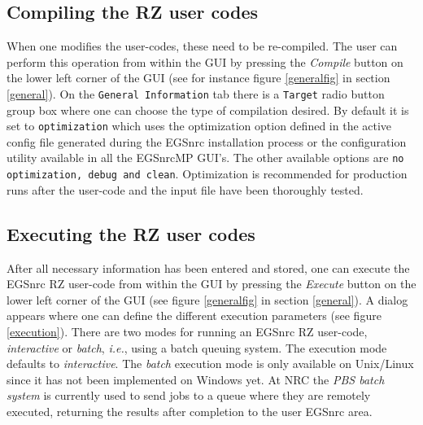 \documentclass[12pt,twoside]{article}   %
\newcommand{\ie}{{\em i.e.}}
\begin{document}
\subsection{Compiling the RZ user codes}

When one modifies the user-codes, these need to be re-compiled.
The user can perform
this operation from within the GUI by pressing the {\em Compile} button on the  lower left
corner of the GUI (see for instance figure \ref{generalfig} in section \ref{general}).
On the {\tt General Information} tab there is a {\tt Target} radio button group box where
one can choose the type of compilation desired. By default it is set to {\tt optimization}
which uses the optimization option defined in the active config file generated during the
EGSnrc installation process or the configuration utility available in all the EGSnrcMP GUI's.
The other available options are {\tt no optimization, debug and clean}.
Optimization is recommended for production runs after the user-code
and the input file have been thoroughly tested.

\subsection{Executing the RZ user codes}

After all necessary information has been entered and stored, one can execute the EGSnrc
RZ user-code from within the GUI by pressing the {\em Execute} button on the  lower left
corner of the GUI (see figure \ref{generalfig} in section \ref{general}). A dialog appears
where one can define the different execution parameters (see figure \ref{execution}).
There are two modes for running an EGSnrc RZ user-code, {\it interactive} or {\it batch}, \ie,
using a batch queuing system. The execution mode defaults to {\it interactive}.
The {\it batch} execution mode is only available on Unix/Linux since it has not
been implemented on Windows yet.
At NRC the {\em PBS batch system} is currently used to send jobs to a queue where
they are remotely executed, returning the results after completion to the
user EGSnrc area.
\end{document}
